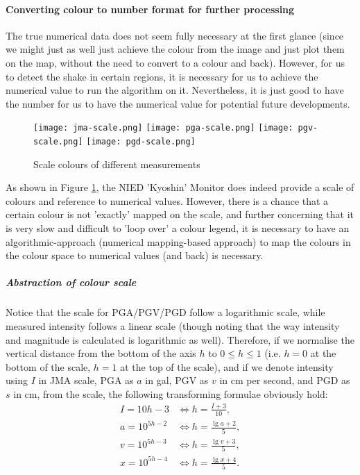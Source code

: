 
\paragraph{Converting colour to number format for further processing}

The true numerical data does not seem fully necessary at the first glance (since we might just as well just achieve the colour from the image and just plot them on the map, without the need to convert to a colour and back). However, for us to detect the shake in certain regions, it is necessary for us to achieve the numerical value to run the algorithm on it. Nevertheless, it is just good to have the number for us to have the numerical value for potential future developments.

\begin{figure}[!ht]
    \centering
    \texttt{[image: jma-scale.png]}
    \texttt{[image: pga-scale.png]}
    \texttt{[image: pgv-scale.png]}
    \texttt{[image: pgd-scale.png]}
    \caption{Scale colours of different measurements}
    \label{fig:scale-colour}
\end{figure}

As shown in Figure \ref{fig:scale-colour}, the NIED 'Kyoshin' Monitor does indeed provide a scale of colours and reference to numerical values. However, there is a chance that a certain colour is not 'exactly' mapped on the scale, and further concerning that it is very slow and difficult to 'loop over' a colour legend, it is necessary to have an algorithmic-approach (numerical mapping-based approach) to map the colours in the colour space to numerical values (and back) is necessary.

\subparagraph{Abstraction of colour scale}

Notice that the scale for PGA/PGV/PGD follow a logarithmic scale, while measured intensity follows a linear scale (though noting that the way intensity and magnitude is calculated is logarithmic as well). Therefore, if we normalise the vertical distance from the bottom of the axis \(h\) to \(0 \leq h \leq 1\) (i.e. \(h = 0\) at the bottom of the scale, \(h = 1\) at the top of the scale), and if we denote intensity using \(I\) in JMA scale, PGA as \(a\) in gal, PGV as \(v\) in cm per second, and PGD as \(s\) in cm, from the scale, the following transforming formulae obviously hold:
\begin{align*}
    I  = 10h - 3     & \iff h      = \frac{I + 3}{10}, \\
    a  = 10^{5h - 2} & \iff h  = \frac{\lg a + 2}{5},  \\
    v  = 10^{5h - 3} & \iff h  = \frac{\lg v + 3}{5},  \\
    x  = 10^{5h - 4} & \iff h  = \frac{\lg x + 4}{5}.  \\
\end{align*}

